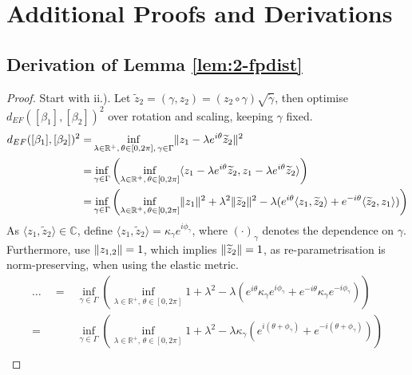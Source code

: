 \label{app:a}

\section{Additional Proofs and Derivations}
\label{app:a-deriv}

\subsection{Derivation of Lemma \ref{lem:2-fpdist}}
\label{app:a-deriv-fpdist}
\begin{proof}
  Start with ii.).
  Let $\widetilde z_2 = (\gamma, z_2) = (z_2 \circ \gamma) \sqrt{\dot\gamma}$, then optimise $d_{EF}([\beta_1],[\beta_2])^2$ over rotation and scaling, keeping $\gamma$ fixed.
  \begin{align*}
    d_{EF}([\beta_1],[\beta_2])^2 
      = & \inf_{\lambda \in \mathbb{R}^+,\, \theta \in [0,2\pi],\, \gamma \in \Gamma} \lVert z_1 - \lambda e^{i\theta} \widetilde z_2\rVert^2 \\
      = & \inf_{\gamma \in \Gamma} \left( \inf_{\lambda \in \mathbb{R}^+,\, \theta \in [0,2\pi]} \langle z_1 - \lambda e^{i\theta} \widetilde z_2, z_1 - \lambda e^{i\theta} \widetilde z_2 \rangle \right) \\
      = & \inf_{\gamma \in \Gamma} \left( \inf_{\lambda \in \mathbb{R}^+,\, \theta \in [0,2\pi]} \lVert z_1\rVert^2 + \lambda^2 \lVert\widetilde z_2\rVert^2 - \lambda ( e^{i\theta} \langle z_1, \widetilde z_2 \rangle + e^{-i\theta} \langle \widetilde z_2, z_1 \rangle ) \right) 
  \end{align*}
  As $\langle z_1, \widetilde z_2 \rangle \in \mathbb{C}$, define $\langle z_1, \widetilde z_2 \rangle = \kappa_\gamma e^{i\phi_\gamma}$, where $(\cdot)_\gamma$ denotes the dependence on $\gamma$. Furthermore, use $\lVert z_{1,2}\rVert = 1$, which implies $\lVert\widetilde z_2\rVert = 1$, as re-parametrisation is norm-preserving, when using the elastic metric.
  \begin{align*}
    \dots\quad
     = & \inf_{\gamma \in \Gamma} \left( \inf_{\lambda \in \mathbb{R}^+,\, \theta \in [0,2\pi]} 1 + \lambda^2  - \lambda ( e^{i\theta} \kappa_\gamma e^{i\phi_\gamma} + e^{-i\theta} \kappa_\gamma e^{-i\phi_\gamma} ) \right) \\
     = & \inf_{\gamma \in \Gamma} \left( \inf_{\lambda \in \mathbb{R}^+,\, \theta \in [0,2\pi]} 1 + \lambda^2  - \lambda \kappa_\gamma \left( e^{i(\theta + \phi_\gamma)} + e^{-i (\theta + \phi_\gamma)} \right) \right) \\

\end{align*}
\end{proof}
